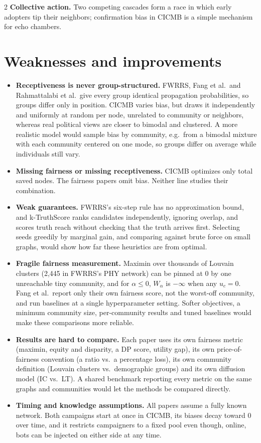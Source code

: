 \documentclass[11pt]{article}
\begin{document}
\begin{multicols}{2}
\textbf{Collective action.} Two competing cascades form a race in which early adopters tip their neighbors; confirmation bias in CICMB is a simple mechanism for echo chambers.

\section{Weaknesses and improvements}
\begin{itemize}
\item \textbf{Receptiveness is never group-structured.} FWRRS, Fang et al.\ and Rahmattalabi et al.\ give every group identical propagation probabilities, so groups differ only in position. CICMB varies bias, but draws it independently and uniformly at random per node, unrelated to community or neighbors, whereas real political views are closer to bimodal and clustered. A more realistic model would sample bias by community, e.g.\ from a bimodal mixture with each community centered on one mode, so groups differ on average while individuals still vary.
\item \textbf{Missing fairness or missing receptiveness.} CICMB optimizes only total saved nodes. The fairness papers omit bias. Neither line studies their combination.
\item \textbf{Weak guarantees.} FWRRS's six-step rule has no approximation bound, and k-TruthScore ranks candidates independently, ignoring overlap, and scores truth reach without checking that the truth arrives first. Selecting seeds greedily by marginal gain, and comparing against brute force on small graphs, would show how far these heuristics are from optimal.
\item \textbf{Fragile fairness measurement.} Maximin over thousands of Louvain clusters (2,445 in FWRRS's PHY network) can be pinned at $0$ by one unreachable tiny community, and for $\alpha\le0$, $W_\alpha$ is $-\infty$ when any $u_c=0$. Fang et al.\ report only their own fairness score, not the worst-off community, and run baselines at a single hyperparameter setting. Softer objectives, a minimum community size, per-community results and tuned baselines would make these comparisons more reliable.
\item \textbf{Results are hard to compare.} Each paper uses its own fairness metric (maximin, equity and disparity, a DP score, utility gap), its own price-of-fairness convention (a ratio vs.\ a percentage loss), its own community definition (Louvain clusters vs.\ demographic groups) and its own diffusion model (IC vs.\ LT). A shared benchmark reporting every metric on the same graphs and communities would let the methods be compared directly.
\item \textbf{Timing and knowledge assumptions.} All papers assume a fully known network. Both campaigns start at once in CICMB, its biases decay toward $0$ over time, and it restricts campaigners to a fixed pool even though, online, bots can be injected on either side at any time.
\end{itemize}


\end{multicols}
\end{document}
